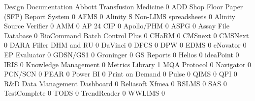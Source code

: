 \documentclass{article}
\begin{document}
\begin{Schunk}
\begin{Soutput}
                                           Design Documentation
  Abbott Transfusion Medicine                                 0
  ADD Shop Floor Paper (SFP) Report System                    0
  AFMS                                                        0
  Alinity S Non-LIMS spreadsheets                             0
  Alinity Source Verifier                                     0
  AMM                                                         0
  AP 24 CIP                                                   0
  Apollo/PHM                                                  0
  ASPG                                                        0
  Assay File Database                                         0
  BioCommand Batch Control Plus                               0
  CHaRM                                                       0
  CMSnext                                                     0
  CMSNext                                                     0
  DARA Filler DHM and RU                                      0
  DaVinci                                                     0
  DFCS                                                        0
  DPW                                                         0
  EDMS                                                        0
  eNovator                                                    0
  EP Evaluator                                                0
  GDSN/GS1                                                    0
  Groninger                                                   0
  GS Reports                                                  0
  Helios                                                      0
  ideaPoint                                                   0
  IRIS                                                        0
  Knowledge Management                                        0
  Metrics Library                                             1
  MQA Protocol                                                0
  Navigator                                                   0
  PCN/SCN                                                     0
  PEAR                                                        0
  Power BI                                                    0
  Print on Demand                                             0
  Pulse                                                       0
  QIMS                                                        0
  QPI                                                         0
  R&D Data Management Dashboard                               0
  Reliasoft Xfmea                                             0
  RSLMS                                                       0
  SAS                                                         0
  TestComplete                                                0
  TODS                                                        0
  TrendReader                                                 0
  WWLIMS                                                      0
                                          

\end{Soutput}
\end{Schunk}
\end{document}
